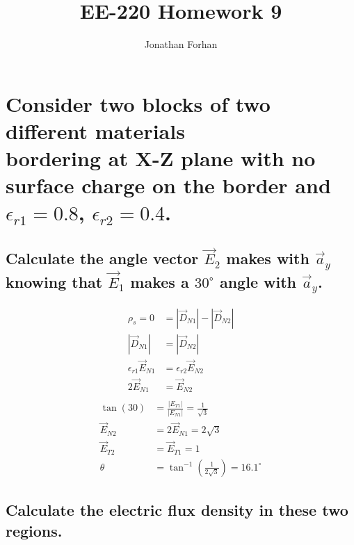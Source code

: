 \documentclass[14pt]{extarticle}
\title{EE-220 Homework 9}
\author{Jonathan Forhan}
\date{ }
\begin{document}
\maketitle

\boldmath
\section{Consider two blocks of two different materials \\
  bordering at X-Z plane with no surface charge on
  the border and $\epsilon_{r1}=0.8$, $\epsilon_{r2}=0.4$.}
\unboldmath

\boldmath
\subsection{Calculate the angle vector $\vec{E}_2$ makes with $\vec{a}_y$ knowing that
	$\vec{E}_1$ makes a $30^\circ$ angle with $\vec{a}_y$.}
\unboldmath

\begin{multicols}{2}
	\begin{align*}
		\rho_s                    = 0 & = \left|\vec{D}_{N1}\right| - \left|\vec{D}_{N2}\right| \\
		\left|\vec{D}_{N1}\right|     & = \left|\vec{D}_{N2}\right|                             \\
		\epsilon_{r1}\vec{E}_{N1}     & = \epsilon_{r2}\vec{E}_{N2}                             \\
		2\vec{E}_{N1}                 & = \vec{E}_{N2}                                          \\
	\end{align*}
	\begin{align*}
		\tan(30)     & = \frac{|E_{T1}|}{|E_{N1}|} = \frac{1}{\sqrt{3}}         \\
		\vec{E}_{N2} & = 2\vec{E}_{N1} = 2\sqrt{3}                              \\
		\vec{E}_{T2} & = \vec{E}_{T1} = 1                                       \\
		\theta       & = \tan^{-1}\left(\frac{1}{2\sqrt{3}}\right) = 16.1^\circ
	\end{align*}
\end{multicols}

\boldmath
\subsection{Calculate the electric flux density in these two regions.}
\unboldmath
\end{document}
